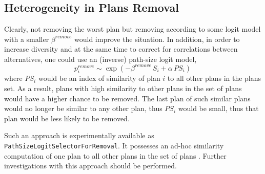 \subsection{Heterogeneity in Plans Removal}
\label{sec:heterogeneity-in-plans-removal}

Clearly, not removing the worst plan but removing according to some logit model with a smaller $\beta^{remove}$ would improve the situation.  In addition, in order to increase diversity and at the same time to correct for correlations between alternatives, one could use an (inverse) path-size logit \citep[e.g.][]{FrejingerBierlaire_TransResB_2007,Prato2009ChoiceModellingSurvey,Schuessler_PhDThesis_2010} model, \ie
\[
p^{remove}_i \sim \exp( - \beta^{remove} \, S_i + \alpha \, PS_i ) \, 
\]
where $PS_i$ would be an index of similarity of plan $i$ to all other plans in the plans set.  As a result, plans with high similarity to other plans in the set of plans would have a higher chance to be removed.  The last plan of such similar plans would no longer be similar to any other plan, thus $PS_i$ would be small, thus that plan would be less likely to be removed.

Such an approach is experimentally available as \lstinline{PathSizeLogitSelectorForRemoval}.  It possesses an ad-hoc similarity computation of one plan to all other plans in the set of plans \citep[][]{Grether_PhDThesis_2014}. Further investigations with this approach should be performed.





